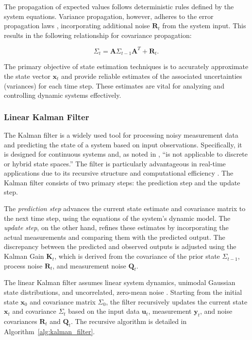 The propagation of expected values follows deterministic rules defined by the system equations. Variance propagation, however, adheres to the error propagation laws \citep{siegwart2004robots}, incorporating additional noise \( \mathbf{R}_t \) from the system input. This results in the following relationship for covariance propagation:

\[
\Sigma_t = \mathbf{A} \Sigma_{t-1} \mathbf{A}^T + \mathbf{R}_t.
\]

The primary objective of state estimation techniques is to accurately approximate the state vector \( \mathbf{x}_t \) and provide reliable estimates of the associated uncertainties (variances) for each time step. These estimates are vital for analyzing and controlling dynamic systems effectively.

\subsubsection{Linear Kalman Filter} 


The Kalman filter is a widely used tool for processing noisy measurement data and predicting the state of a system based on input observations. Specifically, it is designed for continuous systems and, as noted in \citep{thrun2000probabilistic}, “is not applicable to discrete or hybrid state spaces.” The filter is particularly advantageous in real-time applications due to its recursive structure and computational efficiency \citep{welch2006kalman}. The Kalman filter consists of two primary steps: the prediction step and the update step. 

The \textit{prediction step} advances the current state estimate and covariance matrix to the next time step, using the equations of the system's dynamic model. 
The \textit{update step}, on the other hand, refines these estimates by incorporating the actual measurements and comparing them with the predicted output. The discrepancy between the predicted and observed outputs is adjusted using the Kalman Gain \( \mathbf{K}_t \), which is derived from the covariance of the prior state \( \Sigma_{t-1} \), process noise \( \mathbf{R}_t \), and measurement noise \( \mathbf{Q}_t \).

The linear Kalman filter assumes linear system dynamics, unimodal Gaussian state distributions, and uncorrelated, zero-mean noise \citep{welch2006kalman}. Starting from the initial state \( \mathbf{x}_0 \) and covariance matrix \( \Sigma_0 \), the filter recursively updates the current state \( \mathbf{x}_t \) and covariance \( \Sigma_t \) based on the input data \( \mathbf{u}_t \), measurement \( \mathbf{y}_t \), and noise covariances \( \mathbf{R}_t \) and \( \mathbf{Q}_t \). The recursive algorithm is detailed in Algorithm~\ref{alg:kalman_filter}.


